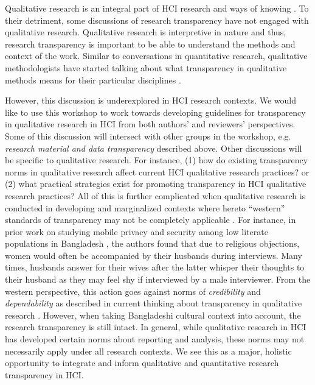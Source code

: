 \documentclass[sigchi-a, authorversion]{acmart}
\begin{document}
Qualitative research is an integral part of HCI research \cite{Cairns2008} and ways of knowing \cite{Olson2014}. To their detriment, some discussions of research transparency have not engaged with qualitative research.  Qualitative research is interpretive in nature \cite{Boehner2007} and thus, research transparency is  important to be able to understand the methods and context of the work. Similar to conversations in quantitative research, qualitative methodologists have started talking about what transparency in qualitative methods means for their particular disciplines \cite{Tong2012,Obrien2014, Moravcsik2014}. 

However, this discussion is underexplored in HCI research contexts. We would like to use this workshop to work towards developing guidelines for transparency in qualitative research in HCI from both authors' and reviewers' perspectives. Some of this discussion will intersect with other groups in the workshop, e.g. \emph{research material and data transparency} described above. Other discussions will be specific to qualitative research. For instance, (1) how do existing transparency norms in qualitative research affect current HCI qualitative research practices? \cite{Schwandt2007} or (2) what practical strategies exist for promoting transparency in HCI qualitative research practices? \cite{Shenton2004} All of this is further complicated when qualitative research is conducted in developing and marginalized contexts where hereto ``western'' standards of transparency may not be completely applicable \cite{Ahmed2017}. For instance, in prior work on studying mobile privacy and security among low literate populations in Bangladesh \cite{Ahmed2017}, the authors found that due to religious objections, women would often be accompanied by their husbands during interviews. Many times, husbands answer for their wives after the latter whisper their thoughts to their husband as they may feel shy if interviewed by a male interviewer. From the western perspective, this action goes against norms of \emph{credibility} and \emph{dependability} as described in current thinking about transparency in qualitative research \cite{Shenton2004}. However, when taking Bangladeshi cultural context into account, the research transparency is still intact. In general, while qualitative research in HCI has developed certain norms about reporting and analysis, these norms may not necessarily apply under all research contexts. We see this as a major, holistic opportunity to integrate and inform qualitative and quantitative research transparency in HCI.
\end{document}

